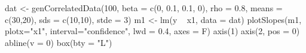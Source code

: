 \begin{Schunk}
\begin{Sinput}
 dat <- genCorrelatedData(100, beta = c(0, 0.1, 0.1, 0), rho = 0.8, means = c(30,20), sds = c(10,10), stde = 3)
 m1 <- lm(y ~ x1, data = dat)
 plotSlopes(m1, plotx="x1", interval="confidence", lwd = 0.4, axes = F)
 axis(1)
 axis(2, pos = 0)
 abline(v = 0)
 box(bty = "L")
\end{Sinput}
\end{Schunk}
